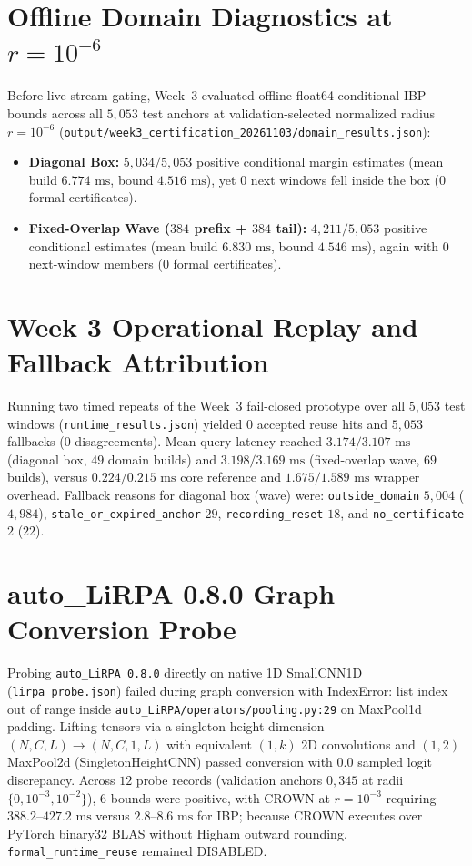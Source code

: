 \documentclass[11pt,oneside,a4paper]{report}
\newcommand{\code}[1]{{\small\upshape\ttfamily #1}}
\newcommand{\pathcode}[1]{{\small\upshape\ttfamily\nolinkurl{#1}}}
\theoremstyle{remark}
\begin{document}
\section{Offline Domain Diagnostics at $r=10^{-6}$}
Before live stream gating, Week~3 evaluated offline \code{float64} conditional IBP bounds across all $5,053$ test anchors at validation-selected normalized radius $r = 10^{-6}$ (\nolinkurl{output/week3_certification_20261103/domain_results.json}):
\begin{itemize}[leftmargin=1.5em]
  \item \textbf{Diagonal Box:} $5,034/5,053$ positive conditional margin estimates (mean build $6.774\text{ ms}$, bound $4.516\text{ ms}$), yet $0$ next windows fell inside the box ($0$ formal certificates).
  \item \textbf{Fixed-Overlap Wave ($384$ prefix + $384$ tail):} $4,211/5,053$ positive conditional estimates (mean build $6.830\text{ ms}$, bound $4.546\text{ ms}$), again with $0$ next-window members ($0$ formal certificates).
\end{itemize}

\section{Week 3 Operational Replay and Fallback Attribution}
Running two timed repeats of the Week~3 fail-closed prototype over all $5,053$ test windows (\pathcode{runtime_results.json}) yielded $0$ accepted reuse hits and $5,053$ fallbacks ($0$ disagreements). Mean query latency reached $3.174 / 3.107\text{ ms}$ (diagonal box, $49$ domain builds) and $3.198 / 3.169\text{ ms}$ (fixed-overlap wave, $69$ builds), versus $0.224 / 0.215\text{ ms}$ core reference and $1.675 / 1.589\text{ ms}$ wrapper overhead. Fallback reasons for diagonal box (wave) were: \pathcode{outside_domain} $5,004$ ($4,984$), \pathcode{stale_or_expired_anchor} $29$, \pathcode{recording_reset} $18$, and \pathcode{no_certificate} $2$ ($22$).

\section{\code{auto\_LiRPA 0.8.0} Graph Conversion Probe}
Probing \pathcode{auto_LiRPA 0.8.0} directly on native 1D \code{SmallCNN1D} (\pathcode{lirpa_probe.json}) failed during graph conversion with \code{IndexError: list index out of range} inside \pathcode{auto_LiRPA/operators/pooling.py:29} on \code{MaxPool1d} padding. Lifting tensors via a singleton height dimension $(N,C,L) \to (N,C,1,L)$ with equivalent $(1,k)$ 2D convolutions and $(1,2)$ \code{MaxPool2d} (\code{SingletonHeightCNN}) passed conversion with $0.0$ sampled logit discrepancy. Across $12$ probe records (validation anchors $0, 345$ at radii $\{0, 10^{-3}, 10^{-2}\}$), $6$ bounds were positive, with CROWN at $r=10^{-3}$ requiring $388.2\text{--}427.2\text{ ms}$ versus $2.8\text{--}8.6\text{ ms}$ for IBP; because CROWN executes over PyTorch \code{binary32} BLAS without Higham outward rounding, \pathcode{formal_runtime_reuse} remained \code{DISABLED}.
\end{document}
